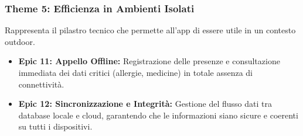\documentclass[11pt]{article}
\begin{document}
\subsubsection{Theme 5: Efficienza in Ambienti Isolati}
Rappresenta il pilastro tecnico che permette all'app di essere utile in un contesto outdoor.
\begin{itemize}
  \item \textbf{Epic 11: Appello Offline:} Registrazione delle presenze e consultazione immediata dei dati critici (allergie, medicine) in totale assenza di connettività.
  \item \textbf{Epic 12: Sincronizzazione e Integrità:} Gestione del flusso dati tra database locale e cloud, garantendo che le informazioni siano sicure e coerenti su tutti i dispositivi.
\end{itemize}

\newpage
\end{document}
